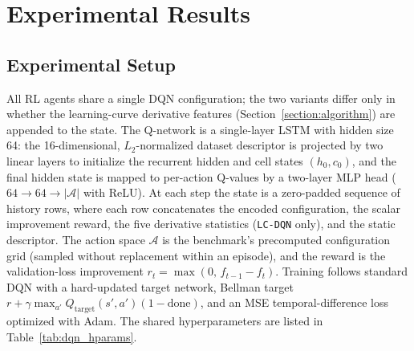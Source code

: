 \section{Experimental Results}
\label{section:exp}

\subsection{Experimental Setup}
\label{section:exp:setup}

All RL agents share a single DQN configuration; the two variants differ only in whether the learning-curve derivative features (Section~\ref{section:algorithm}) are appended to the state. The Q-network is a single-layer LSTM with hidden size 64: the 16-dimensional, $L_2$-normalized dataset descriptor is projected by two linear layers to initialize the recurrent hidden and cell states $(h_0, c_0)$, and the final hidden state is mapped to per-action Q-values by a two-layer MLP head ($64 \rightarrow 64 \rightarrow |\mathcal{A}|$ with ReLU). At each step the state is a zero-padded sequence of history rows, where each row concatenates the encoded configuration, the scalar improvement reward, the five derivative statistics (\texttt{LC-DQN} only), and the static descriptor. The action space $\mathcal{A}$ is the benchmark's precomputed configuration grid (sampled without replacement within an episode), and the reward is the validation-loss improvement $r_t = \max(0,\, f_{t-1} - f_t)$. Training follows standard DQN with a hard-updated target network, Bellman target $r + \gamma \max_{a'} Q_{\text{target}}(s', a')(1 - \text{done})$, and an MSE temporal-difference loss optimized with Adam. The shared hyperparameters are listed in Table~\ref{tab:dqn_hparams}.


